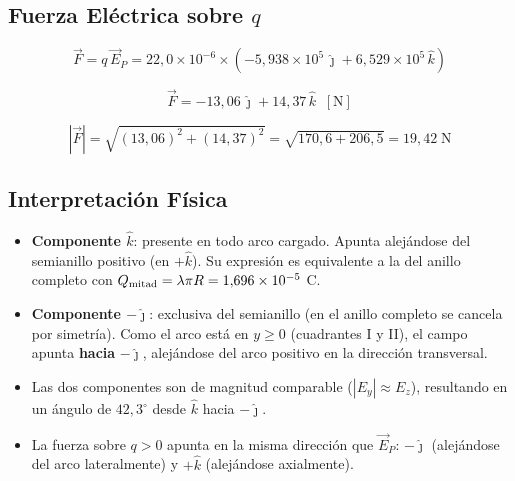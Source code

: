 \documentclass[12pt,letterpaper]{article}
\begin{document}
\subsection*{Fuerza El\'ectrica sobre $q$}

\begin{equation*}
    \vec{F} = q\,\vec{E}_P
    = 22{,}0\times10^{-6}\times(-5{,}938\times10^5\,\hat{\jmath}+6{,}529\times10^5\,\hat{k})
\end{equation*}

\begin{equation*}
    \boxed{\vec{F} = -13{,}06\,\hat{\jmath}+14{,}37\,\hat{k}\;\;[\text{N}]}
\end{equation*}

\begin{equation*}
    |\vec{F}| = \sqrt{(13{,}06)^2+(14{,}37)^2} = \sqrt{170{,}6+206{,}5} = 19{,}42\;\text{N}
\end{equation*}

\subsection*{Interpretaci\'on F\'isica}

\begin{itemize}
    \item \textbf{Componente $\hat{k}$}: presente en todo arco cargado. Apunta alej\'andose del
          semianillo positivo (en $+\hat{k}$). Su expresi\'on es equivalente a la del anillo
          completo con $Q_{\rm mitad} = \lambda\pi R = 1{,}696\times10^{-5}$ C.
    \item \textbf{Componente $-\hat{\jmath}$}: exclusiva del semianillo (en el anillo completo se
          cancela por simetr\'ia). Como el arco est\'a en $y\geq0$ (cuadrantes I y II), el campo
          apunta \textbf{hacia} $-\hat{\jmath}$, alej\'andose del arco positivo en la
          direcci\'on transversal.
    \item Las dos componentes son de magnitud comparable ($|E_y| \approx E_z$), resultando en un
          \'angulo de $42{,}3^\circ$ desde $\hat{k}$ hacia $-\hat{\jmath}$.
    \item La fuerza sobre $q > 0$ apunta en la misma direcci\'on que $\vec{E}_P$:
          $-\hat{\jmath}$ (alejándose del arco lateralmente) y $+\hat{k}$ (alejándose axialmente).
\end{itemize}
\end{document}
